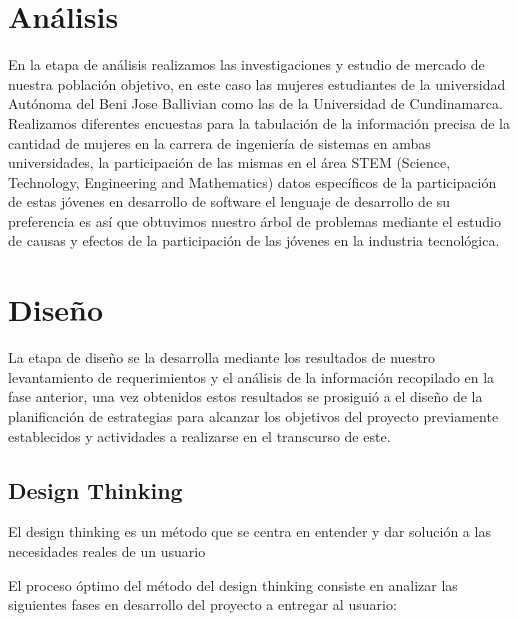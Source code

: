 \documentclass[hidelinks]{Documento}
\begin{document}
\section{Análisis}
En la etapa de análisis realizamos las investigaciones y estudio de mercado de nuestra población objetivo, en este caso las mujeres estudiantes de la universidad Autónoma del Beni Jose Ballivian como las de la Universidad de Cundinamarca.
Realizamos diferentes encuestas para la tabulación de la información precisa de la cantidad de mujeres en la carrera de ingeniería de sistemas en ambas universidades, la participación de las mismas en el área STEM (Science, Technology, Engineering and Mathematics) datos específicos de la participación de estas jóvenes en desarrollo de software el lenguaje de desarrollo de su preferencia es así que obtuvimos nuestro árbol de problemas mediante el estudio de causas y efectos de la participación de las jóvenes en la industria tecnológica.

\section{Diseño}
La etapa de diseño se la desarrolla mediante los resultados de nuestro levantamiento de requerimientos y el análisis de la información recopilado en la fase anterior, una vez obtenidos estos resultados se prosiguió a el diseño de la planificación de estrategias para alcanzar los objetivos del proyecto previamente establecidos y actividades a realizarse en el transcurso de este.
\subsection{Design Thinking}
El design thinking es un método que se centra en entender y dar solución a las necesidades reales de un usuario

El proceso óptimo del método del design thinking consiste en analizar las siguientes fases en desarrollo del proyecto a entregar al usuario:
\end{document}
